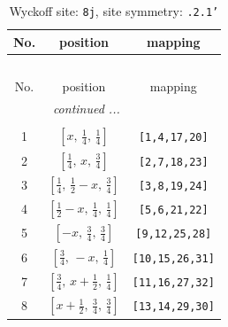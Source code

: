\documentclass[fleqn,8pt]{jsarticle}
\begin{document}
\begin{longtable}{ccc}
\caption{Wyckoff site: {\tt 8j}, site symmetry: {\tt .2.1'}}
 \\
 \hline \hline
No. & position & mapping \\ \hline \endfirsthead

\multicolumn{2}{l}{\tablename\ \thetable{}} \\
 \hline \hline
No. & position & mapping \\ \hline \endhead

 \hline \hline
\multicolumn{2}{r}{\footnotesize\it continued ...} \\ \endfoot

 \hline \hline
\multicolumn{2}{r}{} \\ \endlastfoot

1 & $\left[ x,\, \frac{1}{4},\, \frac{1}{4} \right]$ & {\tt [1,4,17,20]} \\ \hline
2 & $\left[ \frac{1}{4},\, x,\, \frac{3}{4} \right]$ & {\tt [2,7,18,23]} \\ \hline
3 & $\left[ \frac{1}{4},\, \frac{1}{2} - x,\, \frac{3}{4} \right]$ & {\tt [3,8,19,24]} \\ \hline
4 & $\left[ \frac{1}{2} - x,\, \frac{1}{4},\, \frac{1}{4} \right]$ & {\tt [5,6,21,22]} \\ \hline
5 & $\left[ - x,\, \frac{3}{4},\, \frac{3}{4} \right]$ & {\tt [9,12,25,28]} \\ \hline
6 & $\left[ \frac{3}{4},\, - x,\, \frac{1}{4} \right]$ & {\tt [10,15,26,31]} \\ \hline
7 & $\left[ \frac{3}{4},\, x + \frac{1}{2},\, \frac{1}{4} \right]$ & {\tt [11,16,27,32]} \\ \hline
8 & $\left[ x + \frac{1}{2},\, \frac{3}{4},\, \frac{3}{4} \right]$ & {\tt [13,14,29,30]} \\
\end{longtable}
\renewcommand{\arraystretch}{1.2}
\end{document}
